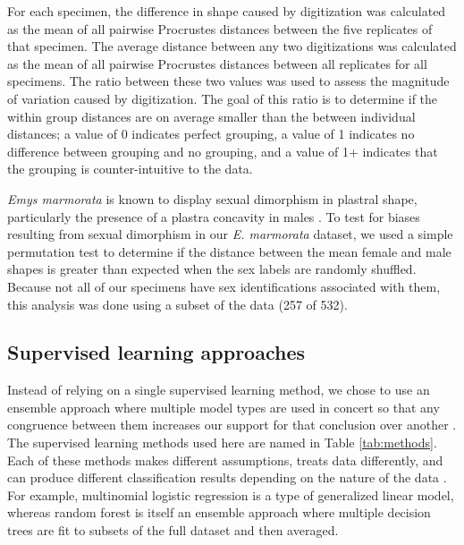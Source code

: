 \documentclass[11pt]{article}
\begin{document}
For each specimen, the difference in shape caused by digitization was calculated as the mean of all pairwise Procrustes distances between the five replicates of that specimen. The average distance between any two digitizations was calculated as the mean of all pairwise Procrustes distances between all replicates for all specimens. The ratio between these two values was used to assess the magnitude of variation caused by digitization. The goal of this ratio is to determine if the within group distances are on average smaller than the between individual distances; a value of 0 indicates perfect grouping, a value of 1 indicates no difference between grouping and no grouping, and a value of 1+ indicates that the grouping is counter-intuitive to the data.

\textit{Emys marmorata} is known to display sexual dimorphism in plastral shape, particularly the presence of a plastra concavity in males \citep{Seeliger1945}. To test for biases resulting from sexual dimorphism in our \textit{E. marmorata} dataset, we used a simple permutation test to determine if the distance between the mean female and male shapes is greater than expected when the sex labels are randomly shuffled. Because not all of our specimens have sex identifications associated with them, this analysis was done using a subset of the data (257 of 532).


\subsection*{Supervised learning approaches}


Instead of relying on a single supervised learning method, we chose to use an ensemble approach where multiple model types are used in concert so that any congruence between them increases our support for that conclusion over another \citep{Hastie2009}. The supervised learning methods used here are named in Table \ref{tab:methods}. Each of these methods makes different assumptions, treats data differently, and can produce different classification results depending on the nature of the data \citep{Hastie2009}. For example, multinomial logistic regression is a type of generalized linear model, whereas random forest is itself an ensemble approach where multiple decision trees are fit to subsets of the full dataset and then averaged.
\end{document}
